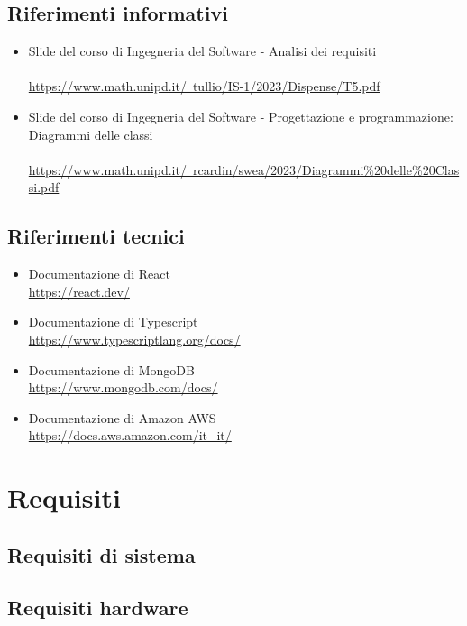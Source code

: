 \documentclass{article}
\begin{document}
{\subsection{Riferimenti informativi}
\begin{itemize}
    \item Slide del corso di Ingegneria del Software - Analisi dei requisiti \\ \\
    \href{https://www.math.unipd.it/~tullio/IS-1/2023/Dispense/T5.pdf}{https://www.math.unipd.it/~tullio/IS-1/2023/Dispense/T5.pdf}
    \item Slide del corso di Ingegneria del Software - Progettazione e programmazione: Diagrammi delle classi \\ \\
\href{https://www.math.unipd.it/~rcardin/swea/2023/Diagrammi%20delle%20Classi.pdf}{https://www.math.unipd.it/~rcardin/swea/2023/Diagrammi\%20delle\%20Classi.pdf}
\end{itemize}
\subsection{Riferimenti tecnici}
\begin{itemize}
\item Documentazione di React \\ \href{ https://react.dev/}{ https://react.dev/}
\item Documentazione di Typescript \\ \href{https://www.typescriptlang.org/docs/}{https://www.typescriptlang.org/docs/}
\item Documentazione di MongoDB \\ \href{https://www.mongodb.com/docs/}{https://www.mongodb.com/docs/}
\item Documentazione di Amazon AWS \\ \href{https://docs.aws.amazon.com/it_it/}{https://docs.aws.amazon.com/it\_it/}
\end{itemize}

\section{Requisiti}
\subsection{Requisiti di sistema}
\subsection{Requisiti hardware}
}
\end{document}
